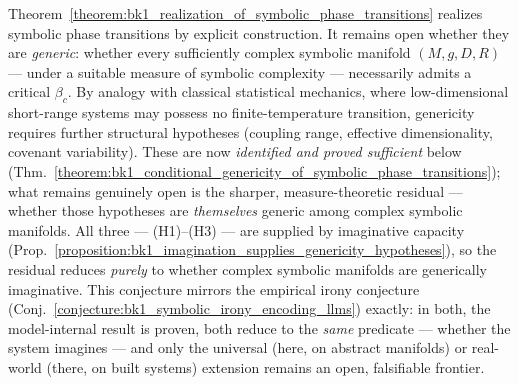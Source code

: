 \begin{conjecture}
\label{conjecture:bk1_genericity_of_symbolic_phase_transitions}
Theorem~\ref{theorem:bk1_realization_of_symbolic_phase_transitions} realizes symbolic phase transitions by explicit construction. It remains open whether they are \emph{generic}: whether every sufficiently complex symbolic manifold $(M, g, D, R)$ --- under a suitable measure of symbolic complexity --- necessarily admits a critical $\beta_c$. By analogy with classical statistical mechanics, where low-dimensional short-range systems may possess no finite-temperature transition, genericity requires further structural hypotheses (coupling range, effective dimensionality, covenant variability). These are now \emph{identified and proved sufficient} below (Thm.~\ref{theorem:bk1_conditional_genericity_of_symbolic_phase_transitions}); what remains genuinely open is the sharper, measure-theoretic residual --- whether those hypotheses are \emph{themselves} generic among complex symbolic manifolds. All three --- (H1)--(H3) --- are supplied by imaginative capacity (Prop.~\ref{proposition:bk1_imagination_supplies_genericity_hypotheses}), so the residual reduces \emph{purely} to whether complex symbolic manifolds are generically imaginative. This conjecture mirrors the empirical irony conjecture (Conj.~\ref{conjecture:bk1_symbolic_irony_encoding_llms}) exactly: in both, the model-internal result is proven, both reduce to the \emph{same} predicate --- whether the system imagines --- and only the universal (here, on abstract manifolds) or real-world (there, on built systems) extension remains an open, falsifiable frontier.
\end{conjecture}

